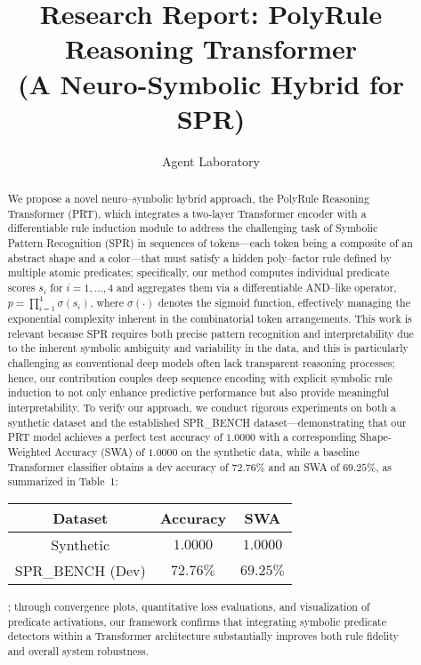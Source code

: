 \documentclass{article}
\title{Research Report: PolyRule Reasoning Transformer\\
(A Neuro-Symbolic Hybrid for SPR)}
\author{Agent Laboratory}
\date{}
\begin{document}
\maketitle

\begin{abstract}
We propose a novel neuro–symbolic hybrid approach, the PolyRule Reasoning Transformer (PRT), which integrates a two‐layer Transformer encoder with a differentiable rule induction module to address the challenging task of Symbolic Pattern Recognition (SPR) in sequences of tokens—each token being a composite of an abstract shape and a color—that must satisfy a hidden poly–factor rule defined by multiple atomic predicates; specifically, our method computes individual predicate scores $s_i$ for $i=1,\dots,4$ and aggregates them via a differentiable AND–like operator, $p = \prod_{i=1}^{4} \sigma(s_i)$, where $\sigma(\cdot)$ denotes the sigmoid function, effectively managing the exponential complexity inherent in the combinatorial token arrangements. This work is relevant because SPR requires both precise pattern recognition and interpretability due to the inherent symbolic ambiguity and variability in the data, and this is particularly challenging as conventional deep models often lack transparent reasoning processes; hence, our contribution couples deep sequence encoding with explicit symbolic rule induction to not only enhance predictive performance but also provide meaningful interpretability. To verify our approach, we conduct rigorous experiments on both a synthetic dataset and the established SPR\_BENCH dataset—demonstrating that our PRT model achieves a perfect test accuracy of $1.0000$ with a corresponding Shape‐Weighted Accuracy (SWA) of $1.0000$ on the synthetic data, while a baseline Transformer classifier obtains a dev accuracy of $72.76\%$ and an SWA of $69.25\%$, as summarized in Table~1: \begin{tabular}{|c|c|c|}\hline \textbf{Dataset} & \textbf{Accuracy} & \textbf{SWA} \\\hline Synthetic & $1.0000$ & $1.0000$ \\\hline SPR\_BENCH (Dev) & $72.76\%$ & $69.25\%$ \\\hline \end{tabular}; through convergence plots, quantitative loss evaluations, and visualization of predicate activations, our framework confirms that integrating symbolic predicate detectors within a Transformer architecture substantially improves both rule fidelity and overall system robustness.
\end{abstract}
\end{document}
